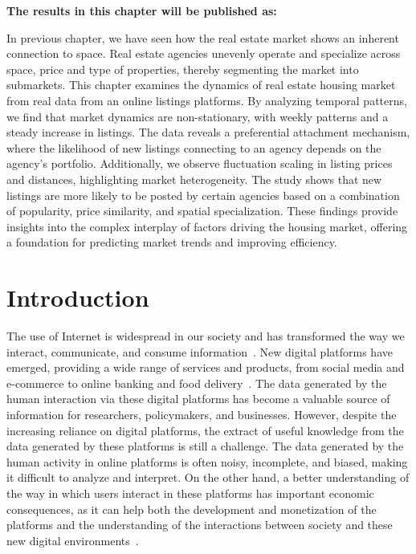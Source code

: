 \vspace{-1.5cm}
\small
\textbf{The results in this chapter will be published as:}
\vspace{0.05 cm}

\normalsize
\vspace{0.5 cm}

In previous chapter, we have seen how the real estate market shows an inherent connection to space. Real estate agencies unevenly operate and specialize across space, price and type of properties, thereby segmenting the market into submarkets. This chapter examines the dynamics of real estate housing market from real data from an online listings platforms. By analyzing temporal patterns, we find that market dynamics are non-stationary, with weekly patterns and a steady increase in listings. The data reveals a preferential attachment mechanism, where the likelihood of new listings connecting to an agency depends on the agency's portfolio. Additionally, we observe fluctuation scaling in listing prices and distances, highlighting market heterogeneity. The study shows that new listings are more likely to be posted by certain agencies based on a combination of popularity, price similarity, and spatial specialization. These findings provide insights into the complex interplay of factors driving the housing market, offering a foundation for predicting market trends and improving efficiency.

\section{Introduction}

The use of Internet is widespread in our society and has transformed the way we interact, communicate, and consume information~\cite{berners-lee-2006,dorogovtsev2002evolution,pastor-satorras-2004,watts-2007}. New digital platforms have emerged, providing a wide range of services and products, from social media and e-commerce to online banking and food delivery~\cite{unknown-author-2013}. The data generated by the human interaction via these digital platforms has become a valuable source of information for researchers, policymakers, and businesses. However, despite the increasing reliance on digital platforms, the extract of useful knowledge from the data generated by these platforms is still a challenge. The data generated by the human activity in online platforms is often noisy, incomplete, and biased, making it difficult to analyze and interpret. On the other hand, a better understanding of the way in which users interact in these platforms has important economic consequences, as it can help both the development and monetization of the platforms and the understanding of the interactions between society and these new digital environments~\cite{choudary-2016}.

